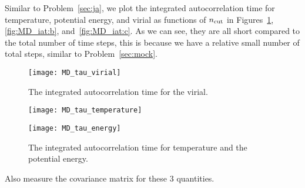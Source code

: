 Similar to Problem~\ref{sec:ja}, we plot the integrated autocorrelation time
for temperature, potential energy, and virial as functions of \(n_\textnormal{cut}\)
in Figures~\ref{fig:MD_iat:a},
\ref{fig:MD_iat:b}, and~\ref{fig:MD_iat:c}.
As we can see, they are all short compared to the total number of time steps,
this is because we have a relative small number of total steps, similar to
Problem~\ref{sec:mock}.

\begin{figure}
    \centering
    \texttt{[image: MD\_tau\_virial]}
    \caption{The integrated autocorrelation time for the virial.}
    \label{fig:MD_iat:a}
\end{figure}

\begin{figure}
    \centering
    \begin{minipage}[t]{0.8\linewidth}
        \centering
        \texttt{[image: MD\_tau\_temperature]}
        \label{fig:MD_iat:b}
    \end{minipage}
    \hfill
    \begin{minipage}[t]{0.8\linewidth}
        \centering
        \texttt{[image: MD\_tau\_energy]}
        \label{fig:MD_iat:c}
    \end{minipage}
    \caption{The integrated autocorrelation time for temperature and the potential energy.}
    \label{fig:MD_iat}
\end{figure}


\Question{} Also measure the covariance matrix for these \(3\) quantities.

